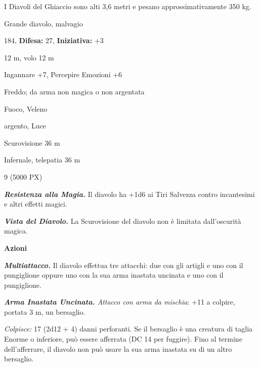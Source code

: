 \begin{multicols}{2}
{I Diavoli del Ghiaccio sono alti 3,6 metri e pesano approssimativamente 350 kg.

\noindent
\begin{description}[noitemsep, topsep=0pt, parsep=0pt, partopsep=0pt, leftmargin=0cm, labelwidth=2.2cm]
	\item[\textbf{Taglia/Tipo:}] Grande diavolo, malvagio
	\item[\textbf{Caratt.:}] 
	\item[\textbf{Punti Ferita:}] 184,  \textbf{Difesa:} 27,  \textbf{Iniziativa:} +3
	\item[\textbf{Movimento:}] 12 m, volo 12 m
	\item[\textbf{Tiri Salvez.:}] 
	\item[\textbf{Comp.:}] Ingannare +7, Percepire Emozioni +6
	\item[\textbf{Res. Danni:}] Freddo; da arma non magica o non argentata
	\item[\textbf{Imm. Danni:}] Fuoco, Veleno
	\item[\textbf{Vulnerabilità:}] argento, Luce
	\item[\textbf{Sensi:}] Scurovisione 36 m
	\item[\textbf{Linguaggi:}] Infernale, telepatia 36 m
	\item[\textbf{Sfida:}] 9 (5000 PX)\smallskip
\end{description}

\emph{\textbf{Resistenza alla Magia.}} Il diavolo ha +1d6 ai Tiri Salvezza contro incantesimi e altri effetti magici.

\emph{\textbf{Vista del Diavolo.}} La Scurovisione del diavolo non è limitata dall'oscurità magica.

\textbf{Azioni}

\emph{\textbf{Multiattacco.}} Il diavolo effettua tre attacchi: due con gli artigli e uno con il pungiglione oppure uno con la sua arma inastata uncinata e uno con il pungiglione.

\emph{\textbf{Arma Inastata Uncinata.} Attacco con arma da mischia}: +11 a colpire, portata 3 m, un bersaglio.

\emph{Colpisce:} 17 (2d12 + 4) danni perforanti. Se il bersaglio è una creatura di taglia Enorme o inferiore, può essere afferrata (DC 14 per fuggire). Fino al termine dell'afferrare, il diavolo non può usare la sua arma inastata su di un altro bersaglio.

}
\end{multicols}
